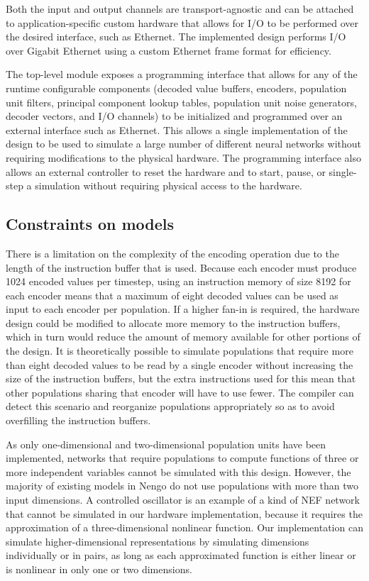 \documentclass[english]{article}
\begin{document}
Both the input and output channels are transport-agnostic and can be attached to application-specific custom hardware that allows for
I/O to be performed over the desired interface, such as Ethernet. The implemented design performs I/O over Gigabit Ethernet using a custom Ethernet frame format for efficiency.

The top-level module exposes a programming interface that allows for any of the runtime configurable components
(decoded value buffers, encoders, population unit filters, principal component lookup tables,
population unit noise generators, decoder vectors, and I/O channels) to be initialized and programmed
over an external interface such as Ethernet. This allows a single implementation of the design
to be used to simulate a large number of different neural networks without requiring modifications to the physical hardware.
The programming interface also allows an external controller to reset the hardware and to start, pause, or single-step a simulation
without requiring physical access to the hardware.

\subsection{Constraints on models}

There is a limitation on the complexity of the encoding operation due to the length of the instruction buffer that is used.
Because each encoder must produce 1024 encoded values per timestep, using an instruction memory of size 8192 for each encoder means that a maximum of eight decoded values
can be used as input to each encoder per population.
If a higher fan-in is required, the hardware design could be modified to allocate more memory to the instruction buffers,
which in turn would reduce the amount of memory available for other portions of the design.
It is theoretically possible to simulate populations that require more than eight decoded values to be read by a single encoder
without increasing the size of the instruction buffers,
but the extra instructions used for this mean that other populations sharing that encoder will have to use fewer.
The compiler can detect this scenario and reorganize populations appropriately so as to avoid overfilling the instruction buffers.

As only one-dimensional and two-dimensional population units have been implemented, networks that require populations to compute functions
of three or more independent variables cannot be simulated with this design.
However, the majority of existing models in Nengo do not use populations with more than two input dimensions.
A controlled oscillator is an example of a kind of NEF network that cannot be simulated in our hardware implementation,
because it requires the approximation of a three-dimensional nonlinear function. Our implementation can simulate higher-dimensional representations
by simulating dimensions individually or in pairs, as long as each approximated function is either linear or is nonlinear in only one or two dimensions.
\end{document}
